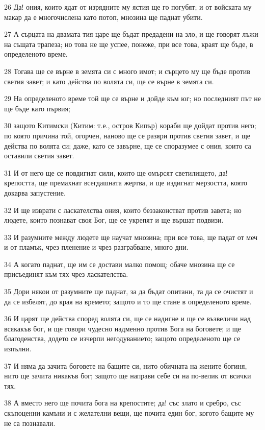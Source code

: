 \par 26 Да! ония, които ядат от изрядните му ястия ще го погубят; и от войската му макар да е многочислена като потоп, мнозина ще паднат убити.
\par 27 А сърцата на двамата тия царе ще бъдат предадени на зло, и ще говорят лъжи на същата трапеза; но това не ще успее, понеже, при все това, краят ще бъде, в определеното време.
\par 28 Тогава ще се върне в земята си с много имот; и сърцето му ще бъде против светия завет; и като действа по волята си, ще се върне в земята си.
\par 29 На определеното време той ще се върне и дойде към юг; но последният път не ще бъде като първия;
\par 30 защото Китимски (Китим: т.е., остров Кипър) кораби ще дойдат против него; по която причина той, огорчен, наново ще се разяри против светия завет, и ще действа по волята си; даже, като се завърне, ще се споразумее с ония, които са оставили светия завет.
\par 31 И от него ще се повдигнат сили, които ще омърсят светилището, да! крепостта, ще премахнат всегдашната жертва, и ще издигнат мерзостта, която докарва запустение.
\par 32 И ще изврати с ласкателства ония, които беззаконстват против завета; но людете, които познават своя Бог, ще се укрепят и ще вършат подвизи.
\par 33 И разумните между людете ще научат мнозина; при все това, ще падат от меч и от пламък, чрез пленение и чрез разграбване, много дни.
\par 34 А когато паднат, ще им се достави малко помощ; обаче мнозина ще се присъединят към тях чрез ласкателства.
\par 35 Дори някои от разумните ще паднат, за да бъдат опитани, та да се очистят и да се избелят, до края на времето; защото и то ще стане в определеното време.
\par 36 И царят ще действа според волята си, ще се надигне и ще се възвеличи над всякакъв бог, и ще говори чудесно надменно против Бога на боговете; и ще благоденства, додето се изчерпи негодуванието; защото определеното ще се изпълни.
\par 37 И няма да зачита боговете на бащите си, нито обичната на жените богиня, нито ще зачита никакъв бог; защото ще направи себе си на по-велик от всички тях.
\par 38 А вместо него ще почита бога на крепостите; да! със злато и сребро, със скъпоценни камъни и с желателни вещи, ще почита един бог, когото бащите му не са познавали.
